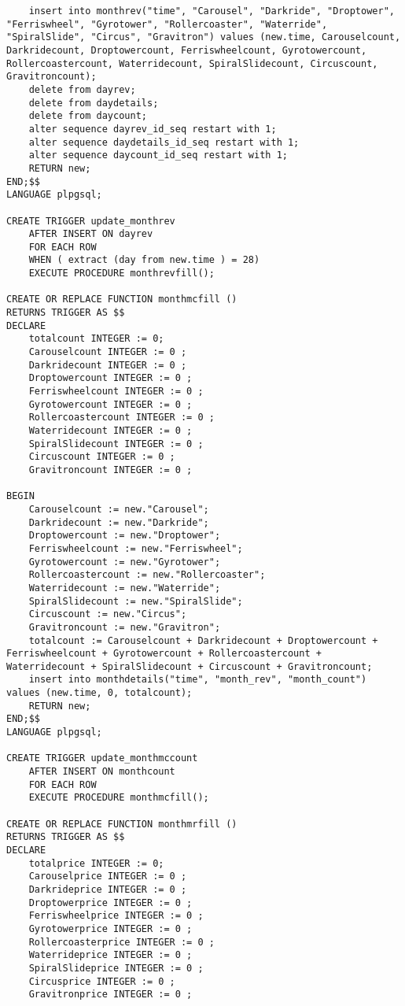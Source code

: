 \begin{verbatim}
    insert into monthrev("time", "Carousel", "Darkride", "Droptower", "Ferriswheel", "Gyrotower", "Rollercoaster", "Waterride", "SpiralSlide", "Circus", "Gravitron") values (new.time, Carouselcount, Darkridecount, Droptowercount, Ferriswheelcount, Gyrotowercount, Rollercoastercount, Waterridecount, SpiralSlidecount, Circuscount, Gravitroncount);
    delete from dayrev;
    delete from daydetails;
    delete from daycount;
    alter sequence dayrev_id_seq restart with 1;
    alter sequence daydetails_id_seq restart with 1;
    alter sequence daycount_id_seq restart with 1;
    RETURN new;
END;$$
LANGUAGE plpgsql;

CREATE TRIGGER update_monthrev
    AFTER INSERT ON dayrev
    FOR EACH ROW
    WHEN ( extract (day from new.time ) = 28)
    EXECUTE PROCEDURE monthrevfill();

CREATE OR REPLACE FUNCTION monthmcfill ()
RETURNS TRIGGER AS $$
DECLARE
    totalcount INTEGER := 0;
    Carouselcount INTEGER := 0 ;
    Darkridecount INTEGER := 0 ;
    Droptowercount INTEGER := 0 ;
    Ferriswheelcount INTEGER := 0 ;
    Gyrotowercount INTEGER := 0 ;
    Rollercoastercount INTEGER := 0 ;
    Waterridecount INTEGER := 0 ;
    SpiralSlidecount INTEGER := 0 ;
    Circuscount INTEGER := 0 ;
    Gravitroncount INTEGER := 0 ;

BEGIN
    Carouselcount := new."Carousel";
    Darkridecount := new."Darkride";
    Droptowercount := new."Droptower";
    Ferriswheelcount := new."Ferriswheel";
    Gyrotowercount := new."Gyrotower";
    Rollercoastercount := new."Rollercoaster";
    Waterridecount := new."Waterride";
    SpiralSlidecount := new."SpiralSlide";
    Circuscount := new."Circus";
    Gravitroncount := new."Gravitron";
    totalcount := Carouselcount + Darkridecount + Droptowercount + Ferriswheelcount + Gyrotowercount + Rollercoastercount + Waterridecount + SpiralSlidecount + Circuscount + Gravitroncount;
    insert into monthdetails("time", "month_rev", "month_count") values (new.time, 0, totalcount);
    RETURN new;
END;$$
LANGUAGE plpgsql;

CREATE TRIGGER update_monthmccount
    AFTER INSERT ON monthcount
    FOR EACH ROW
    EXECUTE PROCEDURE monthmcfill();

CREATE OR REPLACE FUNCTION monthmrfill ()
RETURNS TRIGGER AS $$
DECLARE
    totalprice INTEGER := 0;
    Carouselprice INTEGER := 0 ;
    Darkrideprice INTEGER := 0 ;
    Droptowerprice INTEGER := 0 ;
    Ferriswheelprice INTEGER := 0 ;
    Gyrotowerprice INTEGER := 0 ;
    Rollercoasterprice INTEGER := 0 ;
    Waterrideprice INTEGER := 0 ;
    SpiralSlideprice INTEGER := 0 ;
    Circusprice INTEGER := 0 ;
    Gravitronprice INTEGER := 0 ;


\end{verbatim}
